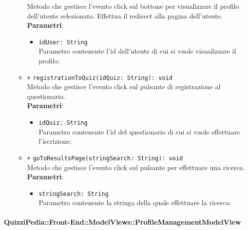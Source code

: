 \begin{itemize}
\begin{itemize}
				Metodo che gestisce l’evento click sul bottone per visualizzare il profilo dell'utente selezionato. Effettua il redirect alla pagina dell'utente.\\
				\textbf{Parametri}:
				\begin{itemize}
					\item \texttt{idUser: String} \\
					Parametro contenente l'id dell'utente di cui si vuole visualizzare il profilo;
				\end{itemize} 
				\item \texttt{+} \texttt{registrationToQuiz(idQuiz: String): void} \\
				Metodo che gestisce l’evento click sul pulsante di registrazione al questionario.\\
				\textbf{Parametri}:
				\begin{itemize}
					\item \texttt{idQuiz: String} \\
					Parametro contenente l'id del questionario di cui si vuole effettuare l'iscrizione;
				\end{itemize} 
				\item \texttt{+} \texttt{goToResultsPage(stringSearch: String): void} \\
				Metodo che gestisce l’evento click sul pulsante per effettuare una ricerca.\\
				\textbf{Parametri}:
				\begin{itemize}
					\item \texttt{stringSearch: String} \\
					Parametro contenente la stringa della quale effettuare la ricerca;
				\end{itemize} 
		\end{itemize}
	\end{itemize}

	\paragraph{QuizziPedia::Front-End::ModelViews::ProfileManagementModelView}
	
	\label{QuizziPedia::Front-End::ModelViews::ProfileManagementModelView}
	
